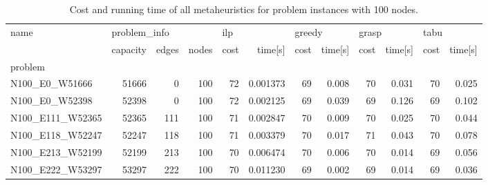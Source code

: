 \begin{landscape}

\begin{table}
\centering
\begin{tabular}{lrrrrrrrrrrr}
\toprule
name & \multicolumn{3}{l}{problem\_info} & \multicolumn{2}{l}{ilp} & \multicolumn{2}{l}{greedy} & \multicolumn{2}{l}{grasp} & \multicolumn{2}{l}{tabu} \\
{} &     capacity & edges & nodes & cost &   time[s] &   cost & time[s] &  cost & time[s] & cost & time[s] \\
problem          &              &       &       &      &           &        &         &       &         &      &         \\
\midrule
N100\_E0\_W51666   &        51666 &     0 &   100 &   72 &  0.001373 &     69 &   0.008 &    70 &   0.031 &   70 &   0.025 \\
N100\_E0\_W52398   &        52398 &     0 &   100 &   72 &  0.002125 &     69 &   0.039 &    69 &   0.126 &   69 &   0.102 \\
N100\_E111\_W52365 &        52365 &   111 &   100 &   71 &  0.002847 &     70 &   0.009 &    70 &   0.025 &   70 &   0.044 \\
N100\_E118\_W52247 &        52247 &   118 &   100 &   71 &  0.003379 &     70 &   0.017 &    71 &   0.043 &   70 &   0.078 \\
N100\_E213\_W52199 &        52199 &   213 &   100 &   70 &  0.006474 &     70 &   0.006 &    70 &   0.014 &   69 &   0.056 \\
N100\_E222\_W53297 &        53297 &   222 &   100 &   70 &  0.011230 &     69 &   0.002 &    69 &   0.014 &   69 &   0.036 \\
\bottomrule
\end{tabular}
\caption{Cost and running time of all metaheuristics for problem instances with 100 nodes.}
\label{table:100-results}
\end{table}

\end{landscape}
